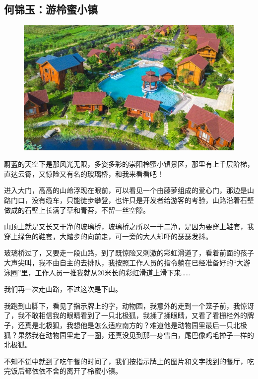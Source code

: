 \vspace{10pt}

{\centering\subsection*{何锦玉：游柃蜜小镇}}


\renewcommand{\leftmark}{何锦玉：游柃蜜小镇}

\begin{figure}[htbp]

\centering

\includegraphics[width = .5\textwidth]{./ch/30.jpg}

\end{figure}




蔚蓝的天空下是那风光无限，多姿多彩的崇阳柃蜜小镇景区，那里有上千层阶梯，直达云霄，又惊险又有名的玻璃桥，和我来看看吧！


进入大门，高高的山岭浮现在眼前，可以看见一个由藤萝组成的爱心门，那边是山路门口，没有缆车，只能徒步攀登，也许只是开发者给游客的考验，山路沿着石壁做成的石壁上长满了草和青苔，不留一丝空隙。


山顶上就是又长又干净的玻璃桥，玻璃桥之所以一干二净，是因为要穿上鞋套，我穿上绿色的鞋套，大踏步的向前走，可一旁的大人却吓的瑟瑟发抖。


玻璃桥过了，又要走一段山路，到了既惊险又刺激的彩虹滑道了，看着前面的孩子大声尖叫，我不由自主的去排队，我按照工作人员的指令躺在已经准备好的“大游泳圈”里，工作人员一推我就从20米长的彩虹滑道上滑下来……


我们再一次走山路，不过这次是下山。


我跑到山脚下，看见了指示牌上的字，动物园，我意外的走到一个笼子前，我惊讶了，我不敢相信我的眼睛看到了一只北极狐，我揉了揉眼睛，又看了看栅栏外的牌子，还真是北极狐，我想他是怎么适应南方的？难道他是动物园里最后一只北极狐？果然我在动物园里走了一圈，还真没见到那一身雪白，尾巴像鸡毛掸子一样的北极狐。


不知不觉中就到了吃午餐的时间了，我们按指示牌上的图片和文字找到的餐厅，吃完饭后都依依不舍的离开了柃蜜小镇。


